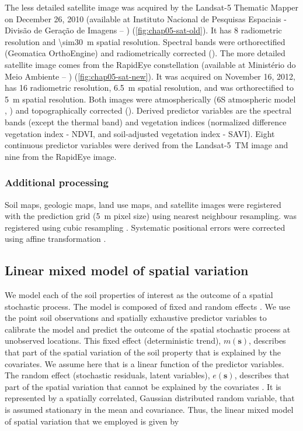The less detailed satellite image was acquired by the Landsat-\num{5} Thematic Mapper on December \num{26}, 
\num{2010} (available at Instituto Nacional de Pesquisas Espaciais - Divisão de Geração de Imagens -- \inpedgi) 
(\autoref{fig:chap05-sat-old}). It has \SI{8}{\bit} radiometric resolution and \SI{\sim30}{\m} spatial 
resolution. Spectral bands were orthorectified (Geomatica OrthoEngine) and radiometrically corrected 
(). The more detailed satellite image comes from the RapidEye constellation (available at 
Ministério do Meio Ambiente -- \mma) (\autoref{fig:chap05-sat-new}). It was acquired on November \num{16}, 
\num{2012}, has \SI{16}{\bit} radiometric resolution, \SI{6.5}{\m} spatial resolution, and was orthorectified 
to \SI{5}{\m} spatial resolution. Both images were atmospherically (6S atmospheric model 
\cite{VermoteEtAl1997}, ) and topographically corrected (). Derived 
predictor variables are the spectral bands (except the thermal band) and vegetation indices (normalized 
difference vegetation index - NDVI, and soil-adjusted vegetation index - SAVI). Eight continuous predictor 
variables were derived from the Landsat-5~TM image and nine from the RapidEye image.

\subsubsection*{Additional processing}
\label{subsubsec:chap05-sources-processing}

Soil maps, geologic maps, land use maps, and satellite images were registered with the prediction grid 
(\SI{5}{\m} pixel size) using nearest neighbour resampling. \demOld{} was registered using cubic resampling 
\cite{Samuel-RosaEtAl2013c}. Systematic positional errors were corrected using affine transformation 
\cite{Samuel-RosaEtAl2014}.

\subsection{Linear mixed model of spatial variation}
\label{subsec:chap05-lmm}

We model each of the soil properties of interest as the outcome of a spatial stochastic process. The model is 
composed of fixed and random effects \cite{HeuvelinkEtAl2001, LarkEtAl2006}. We use the point soil 
observations and spatially exhaustive predictor variables to calibrate the model and predict the outcome of the 
spatial stochastic process at unobserved locations. This fixed effect (deterministic trend), $m(\textbf{s})$, 
describes that part of the spatial variation of the soil property that is explained by the covariates. We 
assume here that is a linear function of the predictor variables. The random effect (stochastic residuals, 
latent variables), $e(\textbf{s})$, describes that part of the spatial variation that cannot be 
explained by the covariates \cite{Cressie1993}. It is represented by a spatially correlated, Gaussian 
distributed random variable, that is assumed stationary in the mean and covariance. Thus, the linear mixed 
model of spatial variation that we employed is given by

